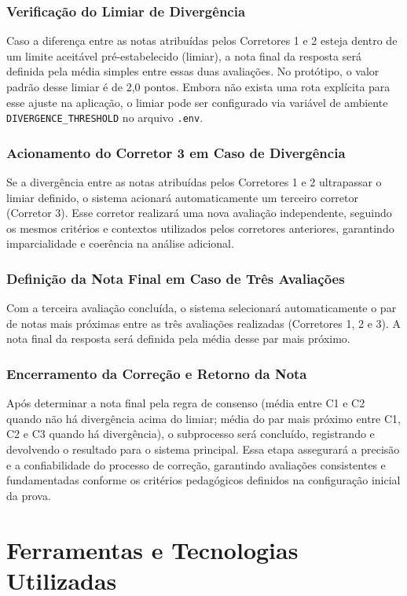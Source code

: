 \subsubsection{Verificação do Limiar de Divergência}
Caso a diferença entre as notas atribuídas pelos Corretores 1 e 2 esteja dentro de um limite aceitável pré-estabelecido (limiar), a nota final da resposta será definida pela média simples entre essas duas avaliações. No protótipo, o valor padrão desse limiar é de 2,0 pontos. Embora não exista uma rota explícita para esse ajuste na aplicação, o limiar pode ser configurado via variável de ambiente \texttt{DIVERGENCE\_THRESHOLD} no arquivo \texttt{.env}.

\subsubsection{Acionamento do Corretor 3 em Caso de Divergência}
Se a divergência entre as notas atribuídas pelos Corretores 1 e 2 ultrapassar o limiar definido, o sistema acionará automaticamente um terceiro corretor (Corretor 3). Esse corretor realizará uma nova avaliação independente, seguindo os mesmos critérios e contextos utilizados pelos corretores anteriores, garantindo imparcialidade e coerência na análise adicional.

\subsubsection{Definição da Nota Final em Caso de Três Avaliações}
Com a terceira avaliação concluída, o sistema selecionará automaticamente o par de notas mais próximas entre as três avaliações realizadas (Corretores 1, 2 e 3). A nota final da resposta será definida pela média desse par mais próximo.

\subsubsection{Encerramento da Correção e Retorno da Nota}
Após determinar a nota final pela regra de consenso (média entre C1 e C2 quando não há divergência acima do limiar; média do par mais próximo entre C1, C2 e C3 quando há divergência), o subprocesso será concluído, registrando e devolvendo o resultado para o sistema principal. Essa etapa assegurará a precisão e a confiabilidade do processo de correção, garantindo avaliações consistentes e fundamentadas conforme os critérios pedagógicos definidos na configuração inicial da prova.

\section{Ferramentas e Tecnologias Utilizadas}

